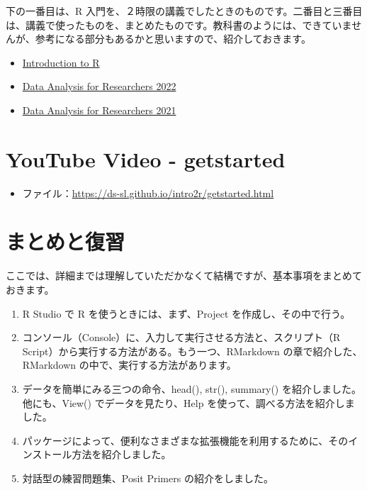 \documentclass[
  xelatex, ja=standard]{bxjsbook}
\providecommand{\tightlist}{%
  \setlength{\itemsep}{0pt}\setlength{\parskip}{0pt}}
\theoremstyle{definition}
\theoremstyle{definition}
\theoremstyle{definition}
\theoremstyle{definition}
\theoremstyle{remark}
\begin{document}
下の一番目は、R 入門を、２時限の講義でしたときのものです。二番目と三番目は、講義で使ったものを、まとめたものです。教科書のようには、できていませんが、参考になる部分もあるかと思いますので、紹介しておきます。

\begin{itemize}
\tightlist
\item
  \href{https://ds-sl.github.io/intro2r/intro2r.nb.html}{Introduction to R}
\item
  \href{https://icu-hsuzuki.github.io/da4r2022/}{Data Analysis for Researchers 2022}
\item
  \href{https://icu-hsuzuki.github.io/da4r2021/}{Data Analysis for Researchers 2021}
\end{itemize}

\hypertarget{youtube-video---getstarted}{%
\section{YouTube Video - getstarted}\label{youtube-video---getstarted}}

\begin{itemize}
\tightlist
\item
  ファイル：\url{https://ds-sl.github.io/intro2r/getstarted.html}
\end{itemize}

\hypertarget{ux307eux3068ux3081ux3068ux5fa9ux7fd2}{%
\section{まとめと復習}\label{ux307eux3068ux3081ux3068ux5fa9ux7fd2}}

ここでは、詳細までは理解していただかなくて結構ですが、基本事項をまとめておきます。

\begin{enumerate}
\def\labelenumi{\arabic{enumi}.}
\item
  R Studio で R を使うときには、まず、Project を作成し、その中で行う。
\item
  コンソール（Console）に、入力して実行させる方法と、スクリプト（R Script）から実行する方法がある。もう一つ、RMarkdown の章で紹介した、RMarkdown の中で、実行する方法があります。
\item
  データを簡単にみる三つの命令、head(), str(), summary() を紹介しました。他にも、View() でデータを見たり、Help を使って、調べる方法を紹介しました。
\item
  パッケージによって、便利なさまざまな拡張機能を利用するために、そのインストール方法を紹介しました。
\item
  対話型の練習問題集、Posit Primers の紹介をしました。
\end{enumerate}
\end{document}
